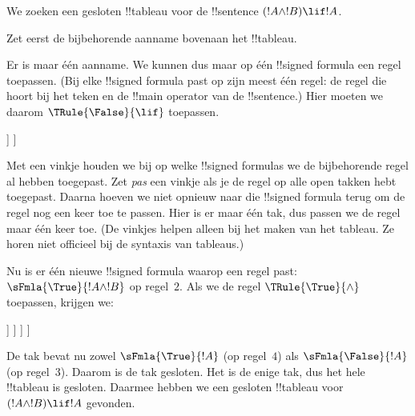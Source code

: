 \documentclass[../../../include/open-logic-section]{subfiles}
\begin{document}
      {}
      {}


\begin{ex}
We zoeken een gesloten !!{tableau} voor de !!{sentence}
$(!A \land !B) \lif !A$.

Zet eerst de bijbehorende aanname bovenaan het !!{tableau}.
\begin{oltableau}
  [\sFmla{\False}{(\formula{A} \land \formula{B}) \lif \formula{A}},
    just = \TAss]
\end{oltableau}

Er is maar één aanname. We kunnen dus maar op één !!{signed formula}
een regel toepassen. (Bij elke !!{signed formula} past op zijn meest één
regel: de regel die hoort bij het teken en de !!{main operator} van de
!!{sentence}.) Hier moeten we daarom $\TRule{\False}{\lif}$ toepassen.
\begin{oltableau}
  [\sFmla{\False}{(\formula{A} \land \formula{B}) \lif \formula{A}},
    checked, just = \TAss
    [\sFmla{\True}{\formula{A} \land \formula{B}},
      just={\TRule{\False}{\lif}[1]}
      [\sFmla{\False}{\formula{A}}, just={\TRule{\False}{\lif}[1]}]
    ]
  ]
\end{oltableau}
Met een vinkje houden we bij op welke !!{signed formula}s we de
bijbehorende regel al hebben toegepast. Zet \emph{pas} een vinkje als je de
regel op alle open takken hebt toegepast. Daarna hoeven we niet opnieuw
naar die !!{signed formula} terug om de regel nog een keer toe te
passen. Hier is er maar één tak, dus passen we de regel maar één keer
toe. (De vinkjes helpen alleen bij het maken van het tableau. Ze horen
niet officieel bij de syntaxis van tableaus.)

Nu is er één nieuwe !!{signed formula} waarop een regel past:
$\sFmla{\True}{!A \land !B}$ op regel~$2$. Als we de regel
$\TRule{\True}{\land}$ toepassen, krijgen we:
\begin{oltableau}
  [\sFmla{\False}{(\formula{A} \land \formula{B}) \lif \formula{A}},
    checked, just = \TAss
    [\sFmla{\True}{\formula{A} \land \formula{B}},
      just={\TRule{\False}{\lif}[1]}, checked
      [\sFmla{\False}{\formula{A}}, just={\TRule{\False}{\lif}[1]}
        [\sFmla{\True}{\formula{A}}, just={\TRule{\True}{\land}[2]}
          [\sFmla{\True}{\formula{B}}, just={\TRule{\True}{\land}[2]}, close
          ]
        ]
      ]
    ]
  ]
\end{oltableau}
De tak bevat nu zowel $\sFmla{\True}{!A}$ (op regel~$4$) als
$\sFmla{\False}{!A}$ (op regel~$3$). Daarom is de tak gesloten. Het is
de enige tak, dus het hele !!{tableau} is gesloten. Daarmee hebben we
een gesloten !!{tableau} voor~$(!A \land !B) \lif !A$ gevonden.
\end{ex}
\end{document}
